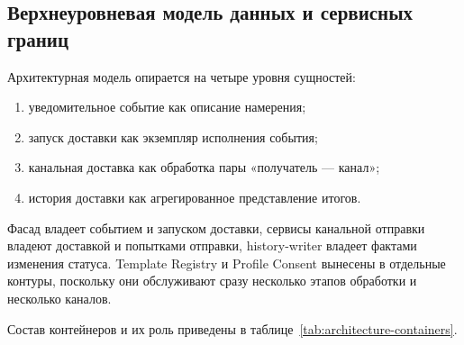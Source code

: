 \subsection{Верхнеуровневая модель данных и сервисных границ}

Архитектурная модель опирается на четыре уровня сущностей:
\begin{enumerate}
    \item уведомительное событие как описание намерения;
    \item запуск доставки как экземпляр исполнения события;
    \item канальная доставка как обработка пары «получатель --- канал»;
    \item история доставки как агрегированное представление итогов.
\end{enumerate}

Фасад владеет событием и запуском доставки, сервисы канальной отправки владеют доставкой и попытками отправки, history-writer владеет фактами изменения статуса. Template Registry и Profile Consent вынесены в отдельные контуры, поскольку они обслуживают сразу несколько этапов обработки и несколько каналов.

Состав контейнеров и их роль приведены в таблице~\ref{tab:architecture-containers}.

